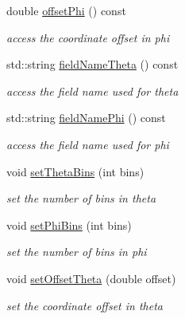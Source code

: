 \begin{DoxyCompactItemize}
double \hyperlink{class_d_d4hep_1_1_d_d_segmentation_1_1_projective_cylinder_aa73aa70d947b5d3271d80d841cb6c828}{offsetPhi} () const 
\begin{DoxyCompactList}\small\item\em access the coordinate offset in phi \item\end{DoxyCompactList}\item 
std::string \hyperlink{class_d_d4hep_1_1_d_d_segmentation_1_1_projective_cylinder_a1f671dc0f8458d3124e558bc814aabec}{fieldNameTheta} () const 
\begin{DoxyCompactList}\small\item\em access the field name used for theta \item\end{DoxyCompactList}\item 
std::string \hyperlink{class_d_d4hep_1_1_d_d_segmentation_1_1_projective_cylinder_a6a162ab172850ebba3125ea4bd82a0b3}{fieldNamePhi} () const 
\begin{DoxyCompactList}\small\item\em access the field name used for phi \item\end{DoxyCompactList}\item 
void \hyperlink{class_d_d4hep_1_1_d_d_segmentation_1_1_projective_cylinder_a24dee799078dacde34e689b0b834e141}{setThetaBins} (int bins)
\begin{DoxyCompactList}\small\item\em set the number of bins in theta \item\end{DoxyCompactList}\item 
void \hyperlink{class_d_d4hep_1_1_d_d_segmentation_1_1_projective_cylinder_a39fb4bdacbf4c6e929a2b3c70d51f7c4}{setPhiBins} (int bins)
\begin{DoxyCompactList}\small\item\em set the number of bins in phi \item\end{DoxyCompactList}\item 
void \hyperlink{class_d_d4hep_1_1_d_d_segmentation_1_1_projective_cylinder_aa6c8515e197f47d176727c8fb6f935a0}{setOffsetTheta} (double offset)
\begin{DoxyCompactList}\small\item\em set the coordinate offset in theta \item\end{DoxyCompactList}\item 

\end{DoxyCompactItemize}
